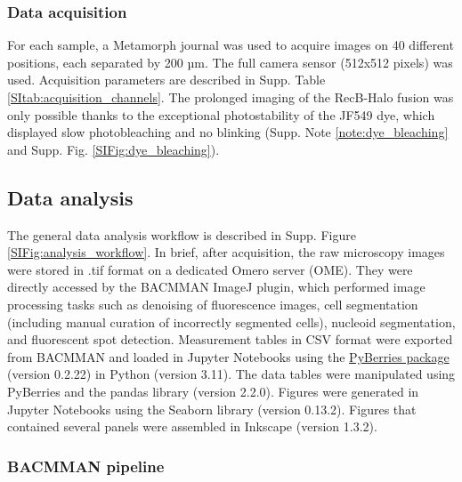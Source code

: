 \subsubsection*{Data acquisition}
For each sample, a Metamorph journal was used to acquire images on 40 different positions, each separated by 200 µm. The full camera sensor (512x512 pixels) was used. Acquisition parameters are described in Supp. Table \ref{SItab:acquisition_channels}. The prolonged imaging of the RecB-Halo fusion was only possible thanks to the exceptional photostability of the JF549 dye, which displayed slow photobleaching and no blinking (Supp. Note \ref{note:dye_bleaching} and Supp. Fig. \ref{SIFig:dye_bleaching}).

\subsection*{Data analysis}
The general data analysis workflow is described in Supp. Figure \ref{SIFig:analysis_workflow}. In brief, after acquisition, the raw microscopy images were stored in .tif format on a dedicated Omero server (OME). They were directly accessed by the BACMMAN ImageJ plugin\cite{Ollion2019}, which performed image processing tasks such as denoising of fluorescence images, cell segmentation (including manual curation of incorrectly segmented cells), nucleoid segmentation, and fluorescent spot detection. Measurement tables in CSV format were exported from BACMMAN and loaded in Jupyter Notebooks using the \href{https://gitlab.com/MEKlab/pyberries}{PyBerries package} (version 0.2.22) in Python (version 3.11). The data tables were manipulated using PyBerries and the pandas library (version 2.2.0). Figures were generated in Jupyter Notebooks using the Seaborn library (version 0.13.2). Figures that contained several panels were assembled in Inkscape (version 1.3.2).

\subsubsection*{BACMMAN pipeline}

